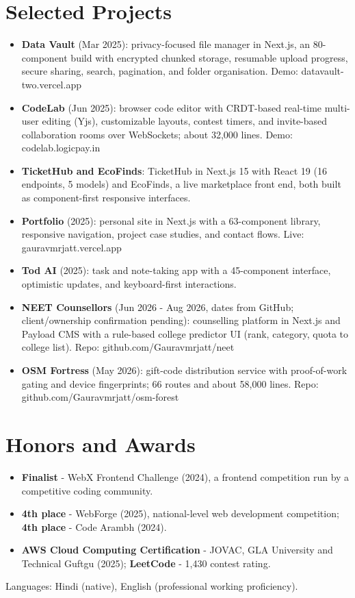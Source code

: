 \documentclass[11pt,a4paper,sans]{moderncv}
\begin{document}
\section{Selected Projects}
\vspace{1pt}
\begin{itemize}
    \item {\textbf{Data Vault} (Mar 2025): privacy-focused file manager in Next.js, an 80-component build with encrypted chunked storage, resumable upload progress, secure sharing, search, pagination, and folder organisation. Demo: datavault-two.vercel.app}
    \item {\textbf{CodeLab} (Jun 2025): browser code editor with CRDT-based real-time multi-user editing (Yjs), customizable layouts, contest timers, and invite-based collaboration rooms over WebSockets; about 32,000 lines. Demo: codelab.logicpay.in}
    \item {\textbf{TicketHub and EcoFinds}: TicketHub in Next.js 15 with React 19 (16 endpoints, 5 models) and EcoFinds, a live marketplace front end, both built as component-first responsive interfaces.}
    \item {\textbf{Portfolio} (2025): personal site in Next.js with a 63-component library, responsive navigation, project case studies, and contact flows. Live: gauravmrjatt.vercel.app}
    \item {\textbf{Tod AI} (2025): task and note-taking app with a 45-component interface, optimistic updates, and keyboard-first interactions.}
    \item {\textbf{NEET Counsellors} (Jun 2026 - Aug 2026, dates from GitHub; client/ownership confirmation pending): counselling platform in Next.js and Payload CMS with a rule-based college predictor UI (rank, category, quota to college list). Repo: github.com/Gauravmrjatt/neet}
    \item {\textbf{OSM Fortress} (May 2026): gift-code distribution service with proof-of-work gating and device fingerprints; 66 routes and about 58,000 lines. Repo: github.com/Gauravmrjatt/osm-forest}
\end{itemize}


\section{Honors and Awards}
\vspace{1pt}
\begin{itemize}
    \item {\textbf{Finalist} - WebX Frontend Challenge (2024), a frontend competition run by a competitive coding community.}
    \item {\textbf{4th place} - WebForge (2025), national-level web development competition; \textbf{4th place} - Code Arambh (2024).}
    \item {\textbf{AWS Cloud Computing Certification} - JOVAC, GLA University and Technical Guftgu (2025); \textbf{LeetCode} - 1,430 contest rating.}
\end{itemize}


\vspace{1pt}
\small{Languages: Hindi (native), English (professional working proficiency).}
\end{document}
